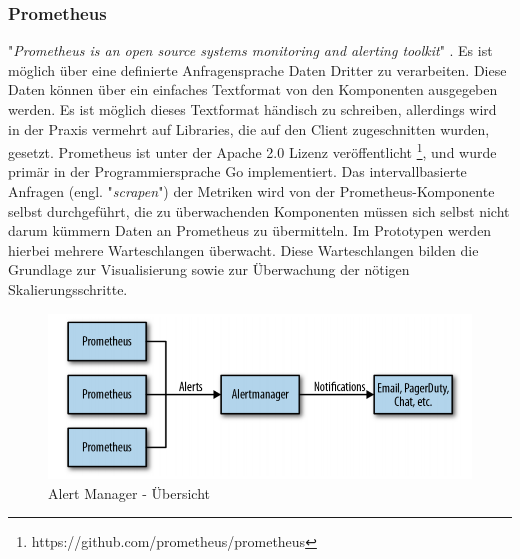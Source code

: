 \subsubsection{Prometheus \checkmark}
\label{ss:prometheus}
"\emph{Prometheus is an open source systems monitoring and alerting toolkit}" \cite[Seite~400]{oreillyPrometheus}. Es ist möglich über eine definierte Anfragensprache Daten Dritter zu verarbeiten. Diese Daten können über ein einfaches Textformat von den Komponenten ausgegeben werden. Es ist möglich dieses Textformat händisch zu schreiben, allerdings wird in der Praxis vermehrt auf Libraries, die auf den Client zugeschnitten wurden, gesetzt. Prometheus ist unter der Apache 2.0 Lizenz veröffentlicht \footnote{https://github.com/prometheus/prometheus}, und wurde primär in der Programmiersprache Go implementiert. Das intervallbasierte Anfragen (engl. "\emph{scrapen}") der Metriken wird von der Prometheus-Komponente selbst durchgeführt, die zu überwachenden Komponenten müssen sich selbst nicht darum kümmern Daten an Prometheus zu übermitteln. Im Prototypen werden hierbei mehrere Warteschlangen überwacht. Diese Warteschlangen bilden die Grundlage zur Visualisierung sowie zur Überwachung der nötigen Skalierungsschritte.

\begin{figure}[ht!]
	\centering
	\includegraphics[width=.8\linewidth]{kapitel/problemloesung/implementierung/_img/alert-man-p291}
	\caption[Alert Manager - Übersicht]{Alert Manager - Übersicht \cite[Seite~291]{oreillyPrometheus}}
	\label{fig:alertManOverview}
\end{figure}

